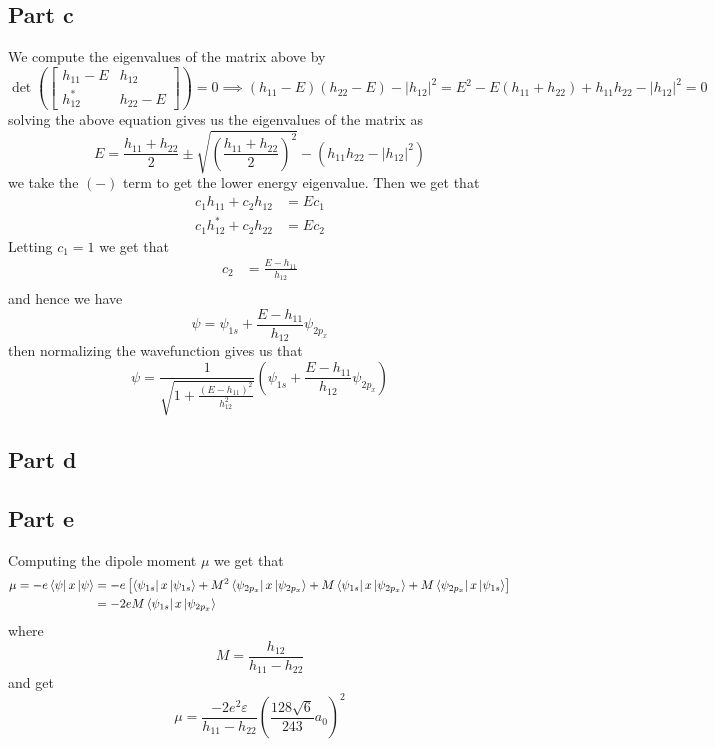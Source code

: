 \documentclass[12pt]{report}
\begin{document}
\subsection*{Part c}
We compute the eigenvalues of the matrix above by
\begin{equation*}
  \det\left(\begin{bmatrix} 
    h_{11} -E & h_{12} \\
    h_{12}^* & h_{22} - E
\end{bmatrix}\right) = 0 \implies (h_{11} - E)(h_{22} - E) - |h_{12}|^2 = E^2 - E(h_{11} + h_{22}) + h_{11}h_{22} - |h_{12}|^2 = 0
\end{equation*}
solving the above equation gives us the eigenvalues of the matrix as
\begin{equation*}
  E = \frac{h_{11} + h_{22}}{2} \pm \sqrt{\left(\frac{h_{11} + h_{22}}{2}\right)^2} - (h_{11}h_{22} - |h_{12}|^2)
\end{equation*}
we take the $(-)$ term to get the lower energy eigenvalue. Then we get that
\begin{align*}
  c_1 h_11 + c_2 h_{12} &= E c_1 \\ 
  c_1 h^*_{12} + c_2 h_{22} &= E c_2
\end{align*}
Letting $c_1 = 1$ we get that
\begin{align*}
  c_2 &= \frac{E-h_{11}}{h_{12}} \\
\end{align*}
and hence we have 
\begin{equation*}
  \psi = \psi_{1s} + \frac{E - h_{11}}{h_{12}}\psi_{2p_x}
\end{equation*}
then normalizing the wavefunction gives us that
\begin{equation*}
  \psi = \frac{1}{\sqrt{1 + \frac{(E - h_{11})^2}{h_{12}^2}}}\left(\psi_{1s} + \frac{E - h_{11}}{h_{12}}\psi_{2p_x}\right)
\end{equation*}

\subsection*{Part d}

\subsection*{Part e}
Computing the dipole moment $\mu$ we get that
\begin{align*}
  \mu = -e\bra{\psi}x\ket{\psi} &= -e \left[\bra{\psi_{1s}}x\ket{\psi_{1s}} + M^2 \bra{\psi_{2p_x}}x\ket{\psi_{2p_x}} + M \bra{\psi_{1s}}x\ket{\psi_{2p_x}} + M \bra{\psi_{2p_x}}x \ket{\psi_{1s}}\right] \\
                                &= -2eM \bra{\psi_{1s}}x\ket{\psi_{2p_x}} \\
\end{align*}
where 
\begin{equation*}
  M = \frac{h_{12}}{h_{11} - h_{22}}
\end{equation*}
and get 
\begin{equation*}
  \mu = \frac{-2e^2\varepsilon}{h_{11} - h_{22}} \left(\frac{128 \sqrt{6}}{243} a_0\right)^2
\end{equation*}
\end{document}
